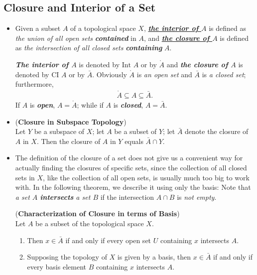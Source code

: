 \documentclass[11pt]{article}
\begin{document}
\subsection{Closure and Interior of a Set}
\begin{itemize}
\item \begin{definition}
Given a subset $A$ of a topological space $X$, \underline{\emph{\textbf{the interior of $A$}}} is defined as \emph{the union of all open sets} \emph{\textbf{contained}} in $A$, and \underline{\emph{\textbf{the closure of $A$}}} is defined as \emph{the intersection of all closed sets} \emph{\textbf{containing}} $A$.

\emph{\textbf{The interior of $A$}} is denoted by $\text{Int }A$ or by $\mathring{A}$ and \emph{\textbf{the closure of $A$}} is denoted by $\text{CI }A$ or
by $\bar{A}$. Obviously $\mathring{A}$ is \emph{an open set} and $\bar{A}$ is \emph{a closed set}; furthermore,
\begin{align*}
\mathring{A} \subseteq A \subseteq \bar{A}.
\end{align*}
If $A$ is \emph{\textbf{open}}, $A = \mathring{A}$; while if $A$ is \emph{\textbf{closed}}, $A = \bar{A}$.
\end{definition}

\item \begin{proposition} (\textbf{Closure in Subspace Topology})\citep{munkres2000topology} \\
Let $Y$ be a subspace of $X$; let $A$ be a subset of $Y$; let $\bar{A}$ denote the closure of $A$ in $X$. Then the closure of $A$ in $Y$ equals $\bar{A} \cap Y$.
\end{proposition}

\item \begin{remark} The definition of the closure of a set does not give us a convenient way for actually finding the closures of specific sets, since the collection of all closed sets in $X$, like the collection of all open sets, is usually much too big to work with. In the following theorem, we describe it using only the basis:
Note that \emph{a set $A$ \textbf{intersects} a set $B$} if the intersection $A \cap B$ is \emph{not empty}.
\end{remark}

\begin{proposition} (\textbf{Characterization of Closure in terms of Basis}) \citep{munkres2000topology} \\
Let $A$ be a subset of the topological space $X$.
\begin{enumerate}
\item Then $x \in \bar{A}$ if and only if every open set $U$ containing $x$ intersects $A$.
\item Supposing the topology of $X$ is given by a basis, then $x \in \bar{A}$ if and only if every basis element $B$ containing $x$ intersects $A$.
\end{enumerate}
\end{proposition}


\end{itemize}
\end{document}
